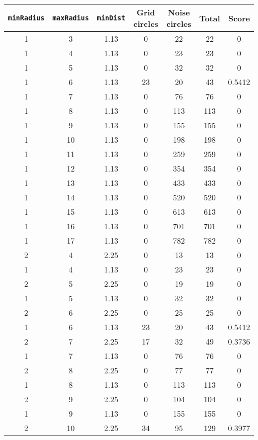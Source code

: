 \documentclass[letterpaper, 12pt]{article}
\begin{document}
\begin{longtable}{|c|c|c|c|c|c|c|}
\hline
\textbf{\texttt{minRadius}} & \textbf{\texttt{maxRadius}} & \textbf{\texttt{minDist}} & \textbf{Grid circles} & \textbf{Noise circles} & \textbf{Total} & \textbf{Score} \\
\hline
1 & 3 & 1.13 & 0 & 22 & 22 & 0 \\
\hline
1 & 4 & 1.13 & 0 & 23 & 23 & 0 \\
\hline
1 & 5 & 1.13 & 0 & 32 & 32 & 0 \\
\hline
1 & 6 & 1.13 & 23 & 20 & 43 & 0.5412 \\
\hline
1 & 7 & 1.13 & 0 & 76 & 76 & 0 \\
\hline
1 & 8 & 1.13 & 0 & 113 & 113 & 0 \\
\hline
1 & 9 & 1.13 & 0 & 155 & 155 & 0 \\
\hline
1 & 10 & 1.13 & 0 & 198 & 198 & 0 \\
\hline
1 & 11 & 1.13 & 0 & 259 & 259 & 0 \\
\hline
1 & 12 & 1.13 & 0 & 354 & 354 & 0 \\
\hline
1 & 13 & 1.13 & 0 & 433 & 433 & 0 \\
\hline
1 & 14 & 1.13 & 0 & 520 & 520 & 0 \\
\hline
1 & 15 & 1.13 & 0 & 613 & 613 & 0 \\
\hline
1 & 16 & 1.13 & 0 & 701 & 701 & 0 \\
\hline
1 & 17 & 1.13 & 0 & 782 & 782 & 0 \\
\hline
2 & 4 & 2.25 & 0 & 13 & 13 & 0 \\
\hline
1 & 4 & 1.13 & 0 & 23 & 23 & 0 \\
\hline
2 & 5 & 2.25 & 0 & 19 & 19 & 0 \\
\hline
1 & 5 & 1.13 & 0 & 32 & 32 & 0 \\
\hline
2 & 6 & 2.25 & 0 & 25 & 25 & 0 \\
\hline
1 & 6 & 1.13 & 23 & 20 & 43 & 0.5412 \\
\hline
2 & 7 & 2.25 & 17 & 32 & 49 & 0.3736 \\
\hline
1 & 7 & 1.13 & 0 & 76 & 76 & 0 \\
\hline
2 & 8 & 2.25 & 0 & 77 & 77 & 0 \\
\hline
1 & 8 & 1.13 & 0 & 113 & 113 & 0 \\
\hline
2 & 9 & 2.25 & 0 & 104 & 104 & 0 \\
\hline
1 & 9 & 1.13 & 0 & 155 & 155 & 0 \\
\hline
2 & 10 & 2.25 & 34 & 95 & 129 & 0.3977 \\

\end{longtable}
\end{document}

